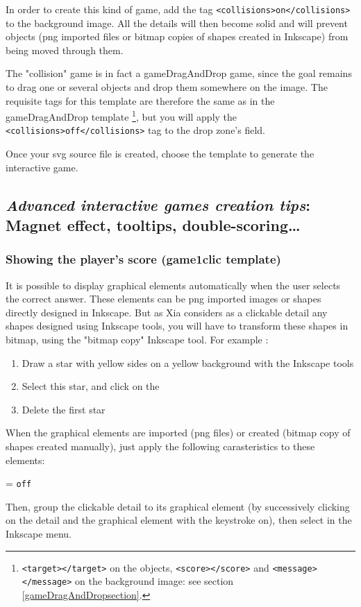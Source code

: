 In order to create this kind of game, add the tag \verb|<collisions>on</collisions>| to the 
background image. All the details will then become solid and will prevent objects 
(png imported files or bitmap copies of shapes created in Inkscape) from being moved through them.

The "collision" game is in fact a gameDragAndDrop game, since the goal remains to 
drag one or several objects and drop them somewhere on the image.
The requisite tags for this template are therefore the same as in the gameDragAndDrop
template \footnote{\texttt{<target></target>} on the objects, \texttt{<score></score>} 
and \texttt{<message></message>} on the background image: see section \ref{gameDragAndDropsection}.}, but you 
will apply the \verb|<collisions>off</collisions>| tag to the drop zone's  field.

Once your svg source file is created, choose the template  to generate the interactive game.

\subsection{\emph{Advanced interactive games creation tips}: Magnet effect, tooltips, double-scoring\ldots}

\subsubsection{Showing the player's score (game1clic template)}\label{playersscore}

It is possible to display graphical elements automatically  when the user 
selects the correct answer. These elements can be png imported images or shapes directly designed in
Inkscape.
But as Xia considers as a clickable 
detail any shapes designed using Inkscape tools, you 
will have to transform these shapes in bitmap, using the "bitmap copy" Inkscape tool. 
For example :
\begin{enumerate}
 \item Draw  a star with yellow sides on a yellow background with the Inkscape tools 
 \item Select this star, and click on the 
 \item Delete the first star
\end{enumerate}

When the graphical elements are imported (png files) or created (bitmap copy 
of shapes created manually), just apply the following 
carasteristics to these elements:
\begin{center}
 = \verb|off|
\end{center}
Then, group the clickable detail to its graphical element (by successively 
clicking on the detail and the graphical element with the \Shift keystroke on),
then select  in the Inkscape  menu.

